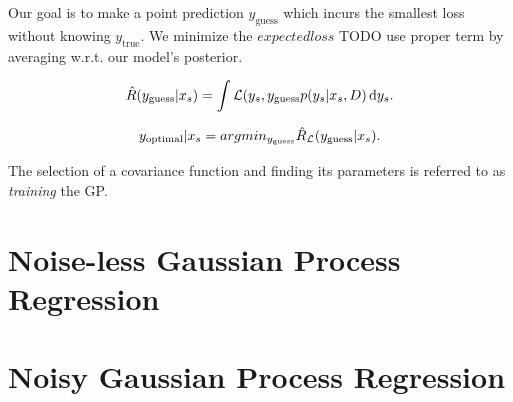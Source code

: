 Our goal is to make a point prediction $y_\text{guess}$ which incurs the
smallest loss without knowing $y_\text{true}$. We minimize the $expected loss$
{TODO use proper term} by averaging w.r.t. our model's posterior.

\begin{equation}
  \hat R(y_\text{guess} | x_s ) = \int {\mathcal{L}} (y_s, y_\text{guess} p(y_s | x_s, D) \mathop{}\!\mathrm{d} y_s.
\end{equation}

\begin{equation}
  y_\text{optimal} | x_s = argmin_{y_\text{guess}} \hat R_{\mathcal{L}}(y_\text{guess} | x_s).
\end{equation}

The selection of a covariance function and finding its parameters is referred
to as \emph{training} the GP.


\section{Noise-less Gaussian Process Regression}

\section{Noisy Gaussian Process Regression}


